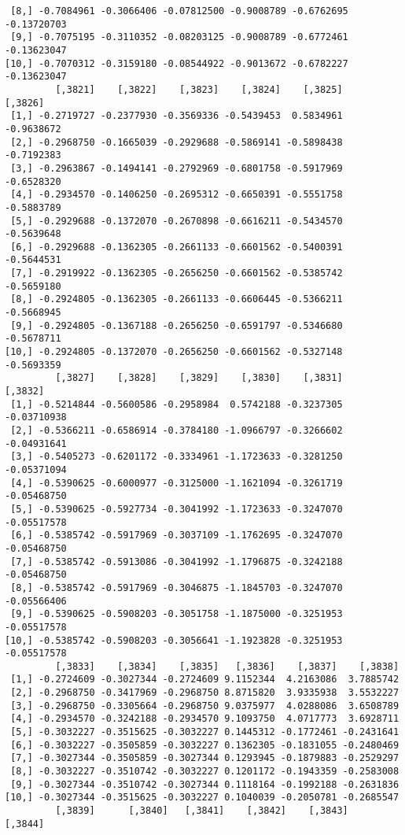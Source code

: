\documentclass[
  letterpaper,
  DIV=11,
  numbers=noendperiod]{scrreprt}
\begin{document}
\begin{verbatim}
 [8,] -0.7084961 -0.3066406 -0.07812500 -0.9008789 -0.6762695 -0.13720703
 [9,] -0.7075195 -0.3110352 -0.08203125 -0.9008789 -0.6772461 -0.13623047
[10,] -0.7070312 -0.3159180 -0.08544922 -0.9013672 -0.6782227 -0.13623047
         [,3821]    [,3822]    [,3823]    [,3824]    [,3825]    [,3826]
 [1,] -0.2719727 -0.2377930 -0.3569336 -0.5439453  0.5834961 -0.9638672
 [2,] -0.2968750 -0.1665039 -0.2929688 -0.5869141 -0.5898438 -0.7192383
 [3,] -0.2963867 -0.1494141 -0.2792969 -0.6801758 -0.5917969 -0.6528320
 [4,] -0.2934570 -0.1406250 -0.2695312 -0.6650391 -0.5551758 -0.5883789
 [5,] -0.2929688 -0.1372070 -0.2670898 -0.6616211 -0.5434570 -0.5639648
 [6,] -0.2929688 -0.1362305 -0.2661133 -0.6601562 -0.5400391 -0.5644531
 [7,] -0.2919922 -0.1362305 -0.2656250 -0.6601562 -0.5385742 -0.5659180
 [8,] -0.2924805 -0.1362305 -0.2661133 -0.6606445 -0.5366211 -0.5668945
 [9,] -0.2924805 -0.1367188 -0.2656250 -0.6591797 -0.5346680 -0.5678711
[10,] -0.2924805 -0.1372070 -0.2656250 -0.6601562 -0.5327148 -0.5693359
         [,3827]    [,3828]    [,3829]    [,3830]    [,3831]     [,3832]
 [1,] -0.5214844 -0.5600586 -0.2958984  0.5742188 -0.3237305 -0.03710938
 [2,] -0.5366211 -0.6586914 -0.3784180 -1.0966797 -0.3266602 -0.04931641
 [3,] -0.5405273 -0.6201172 -0.3334961 -1.1723633 -0.3281250 -0.05371094
 [4,] -0.5390625 -0.6000977 -0.3125000 -1.1621094 -0.3261719 -0.05468750
 [5,] -0.5390625 -0.5927734 -0.3041992 -1.1723633 -0.3247070 -0.05517578
 [6,] -0.5385742 -0.5917969 -0.3037109 -1.1762695 -0.3247070 -0.05468750
 [7,] -0.5385742 -0.5913086 -0.3041992 -1.1796875 -0.3242188 -0.05468750
 [8,] -0.5385742 -0.5917969 -0.3046875 -1.1845703 -0.3247070 -0.05566406
 [9,] -0.5390625 -0.5908203 -0.3051758 -1.1875000 -0.3251953 -0.05517578
[10,] -0.5385742 -0.5908203 -0.3056641 -1.1923828 -0.3251953 -0.05517578
         [,3833]    [,3834]    [,3835]   [,3836]    [,3837]    [,3838]
 [1,] -0.2724609 -0.3027344 -0.2724609 9.1152344  4.2163086  3.7885742
 [2,] -0.2968750 -0.3417969 -0.2968750 8.8715820  3.9335938  3.5532227
 [3,] -0.2968750 -0.3305664 -0.2968750 9.0375977  4.0288086  3.6508789
 [4,] -0.2934570 -0.3242188 -0.2934570 9.1093750  4.0717773  3.6928711
 [5,] -0.3032227 -0.3515625 -0.3032227 0.1445312 -0.1772461 -0.2431641
 [6,] -0.3032227 -0.3505859 -0.3032227 0.1362305 -0.1831055 -0.2480469
 [7,] -0.3027344 -0.3505859 -0.3027344 0.1293945 -0.1879883 -0.2529297
 [8,] -0.3032227 -0.3510742 -0.3032227 0.1201172 -0.1943359 -0.2583008
 [9,] -0.3027344 -0.3510742 -0.3027344 0.1118164 -0.1992188 -0.2631836
[10,] -0.3027344 -0.3515625 -0.3032227 0.1040039 -0.2050781 -0.2685547
         [,3839]      [,3840]   [,3841]    [,3842]    [,3843]     [,3844]

\end{verbatim}
\end{document}

